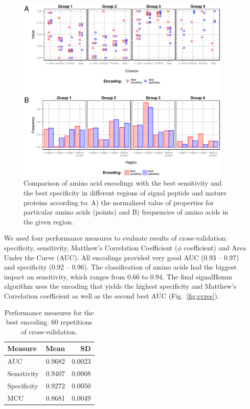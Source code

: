\documentclass[10pt,letterpaper]{article}
\begin{document}
\begin{figure}[ht]\centering
\includegraphics[width=0.95\textwidth]{figures/enccomp.eps}
\caption{Comparison of amino acid encodings with the best sensitivity and the best
specificity in different regions of signal peptide and mature proteins according to: A) the normalized value of properties for particular amino acids (points) and B) frequencies of amino acids in the given region.}
\label{fig:enccomp}
\end{figure}

We used four performance measures to evaluate results of cross-validation: specificity, sensitivity, Matthew's Correlation Coefficient ($\phi$ coefficient) and Area Under the Curve (AUC). All encodings provided very good AUC (0.93 -- 0.97) and specificity (0.92 -- 0.96). The classification of amino acids had the biggest impact on sensitivity, which ranges from 0.66 to 0.94. The final signalHsmm algorithm uses the encoding that yields the highest specificity and Matthew's Correlation coefficient as well as the second best AUC (Fig.~\ref{fig:cvres}).

\begin{table}[ht]
\centering
\caption{Performance measures for the best encoding. 60 repetitions of cross-validation.} 
\label{tab:perfmeas}
\begin{tabular}{lrr}
  \toprule
Measure & Mean & SD \\ 
  \midrule
AUC & 0.9682 & 0.0023 \\ 
   \rowcolor[gray]{0.85}Sensitivity & 0.9407 & 0.0008 \\ 
  Specificity & 0.9272 & 0.0050 \\ 
   \rowcolor[gray]{0.85}MCC & 0.8681 & 0.0049 \\ 
   \bottomrule
\end{tabular}
\end{table}
\end{document}
